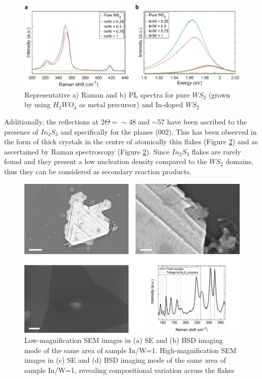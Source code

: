 \begin{figure}[H]
	\begin{center}
		\includegraphics[scale=0.5]{In/RamanPL.png}
		\caption{Representative a) Raman and b) PL spectra for pure $WS_2$ (grown by using $H_2WO_4$ as metal precursor) and In-doped $WS_2$}
		\label{fig:InRamanPL}
	\end{center}
\end{figure}

Additionally, the reflections at $2\Theta ={\sim}48$ and $\sim$57 have been ascribed to the presence of $In_2S_3$ \cite{Hahn1949} and specifically for the planes (002). This has been observed in the form of thick crystals in the centre of atomically thin flakes (Figure \ref{fig:InSEMCentre}) and as ascertained by Raman spectroscopy (Figure \ref{fig:InSEMCentre}). Since $In_2S_3$ flakes are rarely found and they present a low nucleation density compared to the $WS_2$ domains, thus they can be considered as secondary reaction products.

\begin{figure}[!h]
	\begin{center}
		\includegraphics[scale=0.5]{In/SEMCentre.png}
		\caption{Low-magnification SEM images in (a) SE and (b) BSD imaging mode of the same area of sample In/W=1. High-magnification SEM images in (c) SE and (d) BSD imaging mode of the same area of sample In/W=1, revealing compositional variation across the flakes}
		\label{fig:InSEMCentre}
	\end{center}
\end{figure}

